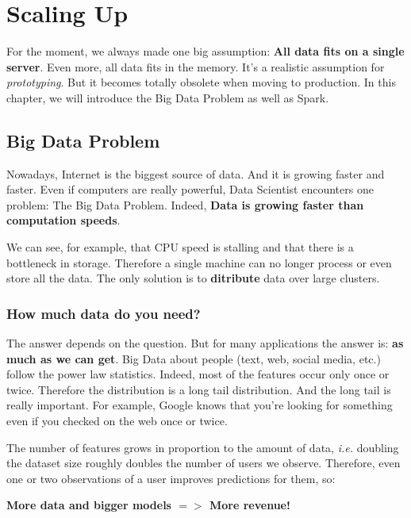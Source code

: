 \section{Scaling Up}

For the moment, we always made one big assumption: {\bf All data fits on a single server}. Even more, all data fits in the memory. It's a realistic assumption for \emph{prototyping}. But it becomes totally obsolete when moving to production. In this chapter, we will introduce the Big Data Problem as well as Spark.

\subsection{Big Data Problem}
Nowadays, Internet is the biggest source of data. And it is growing faster and faster. Even if computers are really powerful, Data Scientist encounters one problem: The Big Data Problem. Indeed, {\bf Data is growing faster than computation speeds}. 

We can see, for example, that CPU speed is stalling and that there is a bottleneck in storage. Therefore a single machine can no longer process or even store all the data. The only solution is to {\bf ditribute} data over large clusters.

\subsubsection{How much data do you need?}
The answer depends on the question. But for many applications the answer is: {\bf as much as we can get}. Big Data about people (text, web, social media, etc.) follow the power law statistics. Indeed, most of the features occur only once or twice. Therefore the distribution is a long tail distribution. And the long tail is really important. For example, Google knows that you're looking for something even if you checked on the web once or twice.

The number of features grows in proportion to the amount of data, {\it i.e.} doubling the dataset size roughly doubles the number of users we observe. Therefore, even one or two observations of a user improves predictions for them, so:
\begin{center}
 {\bf More data and bigger models $=>$ More revenue!}
\end{center}

